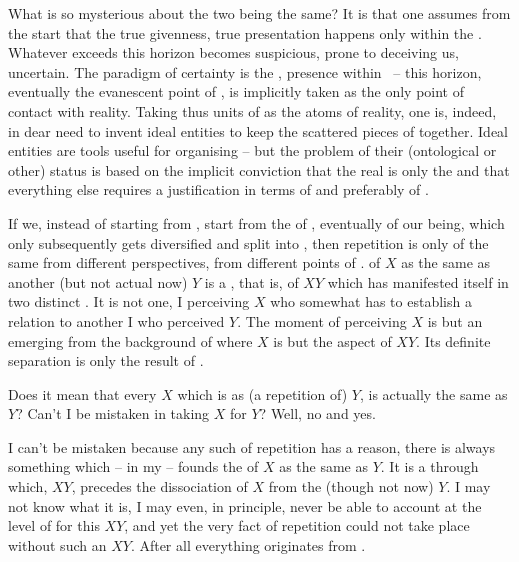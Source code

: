 \pa What is so mysterious about the two being the same?  It is that one assumes
from the start that the true givenness, true presentation happens only within
the \hoa.  Whatever exceeds this horizon becomes suspicious, prone to deceiving
us, uncertain.  The paradigm of certainty is the , presence within
\hoa\ -- this horizon, eventually the evanescent point of , is
implicitly taken as the only point of contact with reality.  Taking thus units
of  as the atoms of reality, one is, indeed, in dear
need to invent ideal entities to keep the scattered pieces of 
together.  Ideal entities are  tools useful for organising
 -- but the problem of their (ontological or other)
status is based on the implicit conviction that the real is only the
 and that everything else requires a justification in terms of
 and preferably of .

If we, instead of starting from , start from the  of
, eventually of our being, which only subsequently gets
diversified and split into , then repetition is only
 of the same from different perspectives, from different
points of .  of $X$ as the same as another
 (but not actual now) $Y$ is a , that is,  of $XY$ which has manifested itself in two distinct
.  It is not one,  I perceiving $X$ who somewhat has
to establish a relation to another I who perceived $Y$. The moment of perceiving
$X$ is but an  emerging from the background of 
where $X$ is but the  aspect of $XY$.  Its definite {separation} is
only the result of .

Does it mean that every $X$ which is  as (a repetition of)
$Y$, is actually the same as $Y$? Can't I be mistaken in taking $X$ for $Y$?
Well, no and yes.

I can't be mistaken because any such  of repetition has a reason,
there is always something which -- in my  -- founds the
 of $X$ as the same as $Y$. It is a  through
 which,  $XY$, precedes the dissociation of
 $X$ from the  (though not now) $Y$. I may 
not know what it is, I may even, in principle, never be able to account at the
level of  for this $XY$, and yet the very fact of repetition
could not take place without such an $XY$. After all everything
originates from . 

